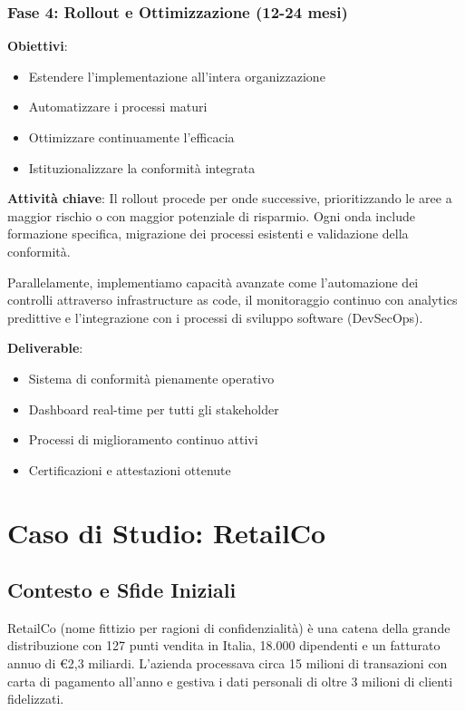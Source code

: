\subsubsection{Fase 4: Rollout e Ottimizzazione (12-24 mesi)}

\textbf{Obiettivi}:
\begin{itemize}
    \item Estendere l'implementazione all'intera organizzazione
    \item Automatizzare i processi maturi
    \item Ottimizzare continuamente l'efficacia
    \item Istituzionalizzare la conformità integrata
\end{itemize}

\textbf{Attività chiave}:
Il rollout procede per onde successive, prioritizzando le aree a maggior rischio o con maggior potenziale di risparmio. Ogni onda include formazione specifica, migrazione dei processi esistenti e validazione della conformità.

Parallelamente, implementiamo capacità avanzate come l'automazione dei controlli attraverso infrastructure as code, il monitoraggio continuo con analytics predittive e l'integrazione con i processi di sviluppo software (DevSecOps).

\textbf{Deliverable}:
\begin{itemize}
    \item Sistema di conformità pienamente operativo
    \item Dashboard real-time per tutti gli stakeholder
    \item Processi di miglioramento continuo attivi
    \item Certificazioni e attestazioni ottenute
\end{itemize}

\section{Caso di Studio: RetailCo}
\label{sec:4.7_caso_studio}

\subsection{Contesto e Sfide Iniziali}
\label{subsec:4.7.1_contesto}

RetailCo (nome fittizio per ragioni di confidenzialità) è una catena della grande distribuzione con 127 punti vendita in Italia, 18.000 dipendenti e un fatturato annuo di €2,3 miliardi. L'azienda processava circa 15 milioni di transazioni con carta di pagamento all'anno e gestiva i dati personali di oltre 3 milioni di clienti fidelizzati.

